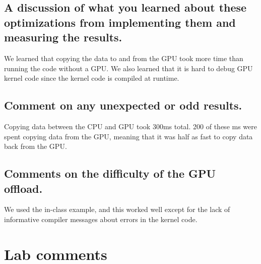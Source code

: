 \documentclass{article}
\begin{document}
\subsection{A discussion of what you learned about these optimizations from implementing them and measuring the results.}
We learned that copying the data to and from the GPU took more time than running the code without a GPU. We also learned that it is hard to debug GPU kernel code since the kernel code is compiled at runtime.

\subsection{Comment on any unexpected or odd results.}
Copying data between the CPU and GPU took 300ms total. 200 of these ms were spent copying data from the GPU, meaning that it was half as fast to copy data back from the GPU. 


\subsection{Comments on the difficulty of the GPU offload.}
We used the in-class example, and this worked well except for the lack of informative compiler messages about errors in the kernel code.

\section{Lab comments}
\end{document}
